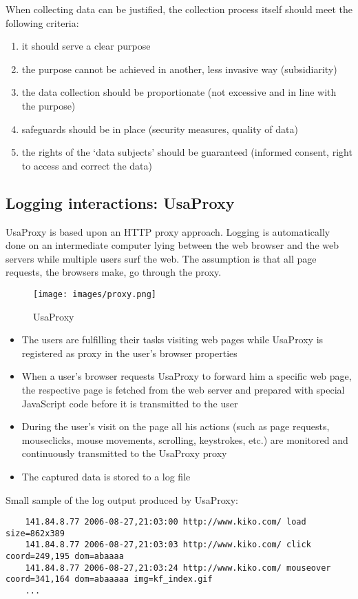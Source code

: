 When collecting data can be justified, the collection process itself should meet the following criteria:
\begin{enumerate}
	\item it should serve a clear purpose
	\item the purpose cannot be achieved in another, less invasive way (subsidiarity)
	\item the data collection should be proportionate (not excessive and in line with the purpose)
	\item safeguards should be in place (security measures, quality of data)
	\item the rights of the ‘data subjects’ should be guaranteed (informed consent, right to access and correct the data)
\end{enumerate}

\subsection{Logging interactions: UsaProxy}
UsaProxy is based upon an HTTP proxy approach. Logging is automatically done on an intermediate computer lying between the web browser and the web servers while multiple users surf the web. The assumption is that all page requests, the browsers make, go through the proxy.
	
\begin{figure}[h] 
	\centering
	\texttt{[image: images/proxy.png]}
	\caption{UsaProxy}
\end{figure}
	
\begin{itemize}	
	\item The users are fulfilling their tasks visiting web pages while UsaProxy is registered as proxy in the user’s browser properties
	\item When a user’s browser requests UsaProxy to forward him a specific web page, the respective page is fetched from the web server and prepared with special JavaScript code before it is transmitted to the user
	\item During the user’s visit on the page all his actions (such as page requests, mouseclicks, mouse movements, scrolling, keystrokes, etc.) are monitored and continuously transmitted to the UsaProxy proxy
	\item The captured data is stored to a log file
\end{itemize}
	
Small sample of the log output produced by UsaProxy:
\begin{verbatim}
	141.84.8.77 2006-08-27,21:03:00 http://www.kiko.com/ load size=862x389
	141.84.8.77 2006-08-27,21:03:03 http://www.kiko.com/ click coord=249,195 dom=abaaaa
	141.84.8.77 2006-08-27,21:03:24 http://www.kiko.com/ mouseover coord=341,164 dom=abaaaaa img=kf_index.gif
	...
\end{verbatim}
	
